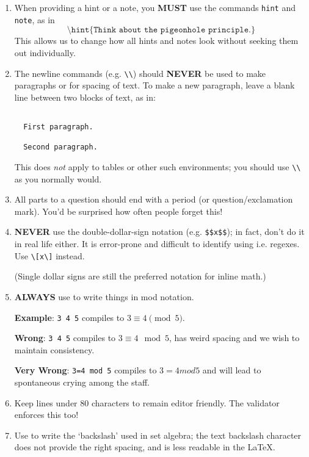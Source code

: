 {\begin{enumerate}
      \texttt{22enumerate} resumes numbering within a single problem if you 
      leave the environment and then enter it again.
    \item When providing a hint or a note, you \textbf{MUST} use the 
      commands \texttt{hint} and \texttt{note}, as in 
      \[\texttt{\textbackslash hint\{Think about the pigeonhole principle.\}}\] 
      This allows us to change how all hints and notes look without seeking 
      them out individually.
    \item The newline commands (e.g. \texttt{\textbackslash\textbackslash}) 
      should \textbf{NEVER} be used to make paragraphs or for spacing of text. 
      To make a new paragraph, leave a blank line between two blocks of text, 
      as in: 
      \begin{verbatim}

  First paragraph.
  
  Second paragraph.

      \end{verbatim}
      
      This does \textit{not} apply to tables or other such environments; you
      should use \texttt{\textbackslash\textbackslash} as you normally would.
    \item All parts to a question should end with a period 
      (or question/exclamation mark). You'd be surprised how often people 
      forget this!
    \item \textbf{NEVER} use the double-dollar-sign notation 
      (e.g. \texttt{\$\$x\$\$}); in fact, don't do it in real life either. 
      It is error-prone and difficult to identify using i.e. regexes. Use 
      \texttt{\textbackslash[x\textbackslash]} instead.
    
      (Single dollar signs are still the preferred notation for inline math.)
    \item \textbf{ALWAYS} use  to write things in mod notation. 
      
      \textbf{Example}: \texttt{3 4 5} compiles to 
        $3\equiv 4\pmod 5$.
      
      \textbf{Wrong}: \texttt{3 4 5} compiles to 
        $3\equiv 4\mod 5$, has weird spacing and we wish to maintain 
        consistency.
      
      \textbf{Very Wrong}: \texttt{3=4 mod 5} compiles to $3=4 mod 5$ and 
        will lead to spontaneous crying among the staff.   
    \item Keep lines under 80 characters to remain editor friendly.
      The validator enforces this too!
    \item Use  to write the `backslash' used in set algebra;
      the text backslash character does not provide the right spacing, and is 
      less readable in the \LaTeX.
  \end{enumerate}
  
}
